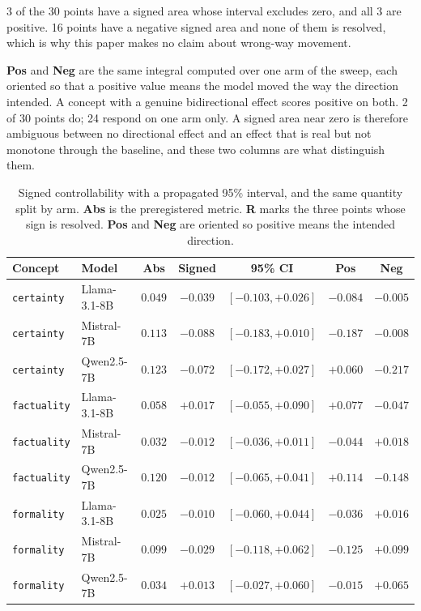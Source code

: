 \documentclass{article}
\begin{document}
3 of the 30 points have a signed area whose interval excludes zero, and all
3 are positive. 16 points have a negative signed area and none of them is
resolved, which is why this paper makes no claim about wrong-way movement.

\textbf{Pos} and \textbf{Neg} are the same integral computed over one arm of
the sweep, each oriented so that a positive value means the model moved the way
the direction intended. A concept with a genuine bidirectional effect scores
positive on both. 2 of 30 points do; 24 respond on one arm only. A signed area
near zero is therefore ambiguous between no directional effect and an effect
that is real but not monotone through the baseline, and these two columns are
what distinguish them.

\begin{table}[htbp]
  \caption{Signed controllability with a propagated 95\% interval, and the
  same quantity split by arm. \textbf{Abs} is the preregistered metric.
  \textbf{R} marks the three points whose sign is resolved. \textbf{Pos} and
  \textbf{Neg} are oriented so positive means the intended direction.}
  \label{tab:signed}
  \centering
  \footnotesize
  \begin{tabular}{llccccc}
    \toprule
    Concept & Model & Abs & Signed & 95\% CI & Pos & Neg \\
    \midrule
    \texttt{certainty} & Llama-3.1-8B & $0.049$ & $-0.039$ & $[-0.103, +0.026]$ & $-0.084$ & $-0.005$ \\
    \texttt{certainty} & Mistral-7B & $0.113$ & $-0.088$ & $[-0.183, +0.010]$ & $-0.187$ & $-0.008$ \\
    \texttt{certainty} & Qwen2.5-7B & $0.123$ & $-0.072$ & $[-0.172, +0.027]$ & $+0.060$ & $-0.217$ \\
    \texttt{factuality} & Llama-3.1-8B & $0.058$ & $+0.017$ & $[-0.055, +0.090]$ & $+0.077$ & $-0.047$ \\
    \texttt{factuality} & Mistral-7B & $0.032$ & $-0.012$ & $[-0.036, +0.011]$ & $-0.044$ & $+0.018$ \\
    \texttt{factuality} & Qwen2.5-7B & $0.120$ & $-0.012$ & $[-0.065, +0.041]$ & $+0.114$ & $-0.148$ \\
    \texttt{formality} & Llama-3.1-8B & $0.025$ & $-0.010$ & $[-0.060, +0.044]$ & $-0.036$ & $+0.016$ \\
    \texttt{formality} & Mistral-7B & $0.099$ & $-0.029$ & $[-0.118, +0.062]$ & $-0.125$ & $+0.099$ \\
    \texttt{formality} & Qwen2.5-7B & $0.034$ & $+0.013$ & $[-0.027, +0.060]$ & $-0.015$ & $+0.065$ \\

\end{tabular}
\end{table}
\end{document}
